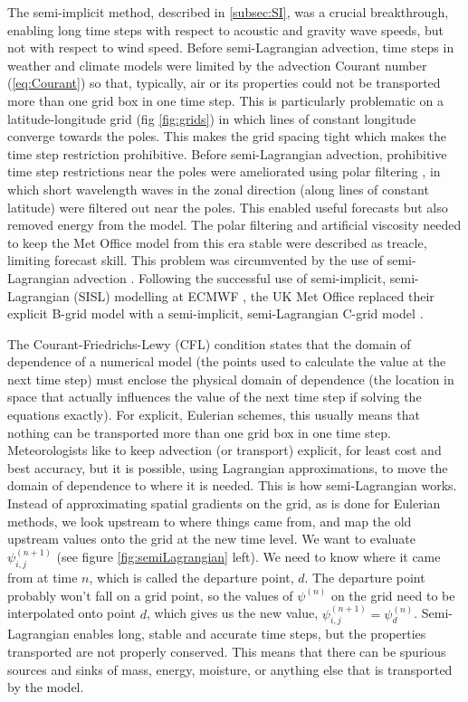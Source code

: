 The semi-implicit method, described in \ref{subsec:SI}, was a crucial
breakthrough, enabling long time steps with respect to acoustic and
gravity wave speeds, but not with respect to wind speed. Before semi-Lagrangian
advection, time steps in weather and climate models were limited by
the advection Courant number (\ref{eq:Courant}) so that, typically,
air or its properties could not be transported more than one grid
box in one time step. This is particularly problematic on a latitude-longitude
grid (fig \ref{fig:grids}) in which lines of constant longitude converge
towards the poles. This makes the grid spacing tight which makes the
time step restriction prohibitive. Before semi-Lagrangian advection,
prohibitive time step restrictions near the poles were ameliorated
using polar filtering \citep[eg.][]{CD91}, in which short wavelength
waves in the zonal direction (along lines of constant latitude) were
filtered out near the poles. This enabled useful forecasts but also
removed energy from the model. The polar filtering and artificial
viscosity needed to keep the Met Office model from this era stable
were described as treacle, limiting forecast skill. This problem was
circumvented by the use of semi-Lagrangian advection \citep{Rob82,PS84,PL91,RTS+95,Hort02,DCM+05}.
Following the successful use of semi-implicit, semi-Lagrangian (SISL)
modelling at ECMWF \citep{RTS+95}, the UK Met Office replaced their
explicit B-grid model with a semi-implicit, semi-Lagrangian C-grid
model \citep{CDM+97,DCM+05}.

The Courant-Friedrichs-Lewy (CFL) condition states that the domain
of dependence of a numerical model (the points used to calculate the
value at the next time step) must enclose the physical domain of dependence
(the location in space that actually influences the value of the next
time step if solving the equations exactly). For explicit, Eulerian
schemes, this usually means that nothing can be transported more than
one grid box in one time step. Meteorologists like to keep advection
(or transport) explicit, for least cost and best accuracy, but it
is possible, using Lagrangian approximations, to move the domain of
dependence to where it is needed. This is how semi-Lagrangian works.
Instead of approximating spatial gradients on the grid, as is done
for Eulerian methods, we look upstream to where things came from,
and map the old upstream values onto the grid at the new time level.
We want to evaluate $\psi_{i,j}^{(n+1)}$ (see figure \ref{fig:semiLagrangian}
left). We need to know where it came from at time $n$, which is called
the departure point, $d$. The departure point probably won't fall
on a grid point, so the values of $\psi^{(n)}$ on the grid need to
be interpolated onto point $d$, which gives us the new value, $\psi_{i,j}^{(n+1)}=\psi_{d}^{(n)}$.
Semi-Lagrangian enables long, stable and accurate time steps, but
the properties transported are not properly conserved. This means
that there can be spurious sources and sinks of mass, energy, moisture,
or anything else that is transported by the model. 

